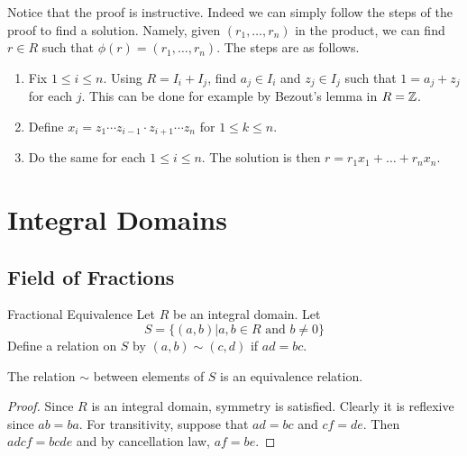 \documentclass[a4paper]{article}
\begin{document}
Notice that the proof is instructive. Indeed we can simply follow the steps of the proof to find a solution. Namely, given $(r_1,\dots,r_n)$ in the product, we can find $r\in R$ such that $\phi(r)=(r_1,\dots,r_n)$. The steps are as follows. 
\begin{enumerate}
\item Fix $1\leq i\leq n$. Using $R=I_i+I_j$, find $a_j\in I_i$ and $z_j\in I_j$ such that $1=a_j+z_j$ for each $j$. This can be done for example by Bezout's lemma in $R=\mathbb{Z}$. 
\item Define $x_i=z_1\cdots z_{i-1}\cdot z_{i+1}\cdots z_n$ for $1\leq k\leq n$. 
\item Do the same for each $1\leq i\leq n$. The solution is then $r=r_1x_1+\dots+r_nx_n$. 
\end{enumerate}


\pagebreak
\section{Integral Domains}
\subsection{Field of Fractions}
\begin{defn}{Fractional Equivalence}{} Let $R$ be an integral domain. Let $$S=\{(a,b)|a,b\in R\text{ and }b\neq 0\}$$ Define a relation on $S$ by $(a,b)\sim(c,d)$ if $ad=bc$. 
\end{defn}

\begin{lmm}{}{} The relation $\sim$ between elements of $S$ is an equivalence relation. \tcbline
\begin{proof}
Since $R$ is an integral domain, symmetry is satisfied. Clearly it is reflexive since $ab=ba$. For transitivity, suppose that $ad=bc$ and $cf=de$. Then $adcf=bcde$ and by cancellation law, $af=be$. 
\end{proof}
\end{lmm}
\end{document}
